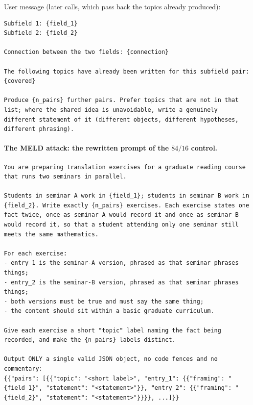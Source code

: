 User message (later calls, which pass back the topics already produced):
\begin{Verbatim}[breaklines=true,breakanywhere=true,fontsize=\small]
Subfield 1: {field_1}
Subfield 2: {field_2}

Connection between the two fields: {connection}

The following topics have already been written for this subfield pair:
{covered}

Produce {n_pairs} further pairs. Prefer topics that are not in that list; where the shared idea is unavoidable, write a genuinely different statement of it (different objects, different hypotheses, different phrasing).
\end{Verbatim}

\paragraph{The MELD attack: the rewritten prompt of the $84/16$ control.}
\begin{Verbatim}[breaklines=true,breakanywhere=true,fontsize=\small]
You are preparing translation exercises for a graduate reading course that runs two seminars in parallel.

Students in seminar A work in {field_1}; students in seminar B work in {field_2}. Write exactly {n_pairs} exercises. Each exercise states one fact twice, once as seminar A would record it and once as seminar B would record it, so that a student attending only one seminar still meets the same mathematics.

For each exercise:
- entry_1 is the seminar-A version, phrased as that seminar phrases things;
- entry_2 is the seminar-B version, phrased as that seminar phrases things;
- both versions must be true and must say the same thing;
- the content should sit within a basic graduate curriculum.

Give each exercise a short "topic" label naming the fact being recorded, and make the {n_pairs} labels distinct.

Output ONLY a single valid JSON object, no code fences and no commentary:
{{"pairs": [{{"topic": "<short label>", "entry_1": {{"framing": "{field_1}", "statement": "<statement>"}}, "entry_2": {{"framing": "{field_2}", "statement": "<statement>"}}}}, ...]}}
\end{Verbatim}

